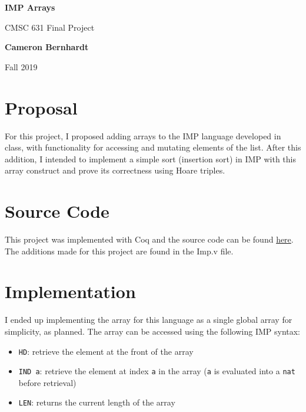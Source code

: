 \documentclass{article}
\begin{document}
    \begin{center}
        \vspace*{1cm}
        
        \Huge
        \textbf{IMP Arrays}
        
        \vspace{0.5cm}
        \LARGE
        CMSC 631 Final Project

        \vspace{1.5cm}

        \textbf{Cameron Bernhardt}

        \vfill

        Fall 2019
    \end{center}
    
    \newpage

    \section{Proposal}
    For this project, I proposed adding arrays to the IMP language developed in class, with functionality for accessing and mutating elements of the list. After this addition, I intended to implement a simple sort (insertion sort) in IMP with this array construct and prove its correctness using Hoare triples.

    \section{Source Code}
    This project was implemented with Coq and the source code can be found \href{https://github.com/AstroCB/IMP-Arrays}{here}. The additions made for this project are found in the Imp.v file.

    \section{Implementation}
    I ended up implementing the array for this language as a single global array for simplicity, as planned. The array can be accessed using the following IMP syntax:
    \begin{itemize}
        \item \texttt{HD}: retrieve the element at the front of the array
        \item \texttt{IND a}: retrieve the element at index \texttt{a} in the array (\texttt{a} is evaluated into a \texttt{nat} before retrieval)
        \item \texttt{LEN}: returns the current length of the array
    \end{itemize}
\end{document}
